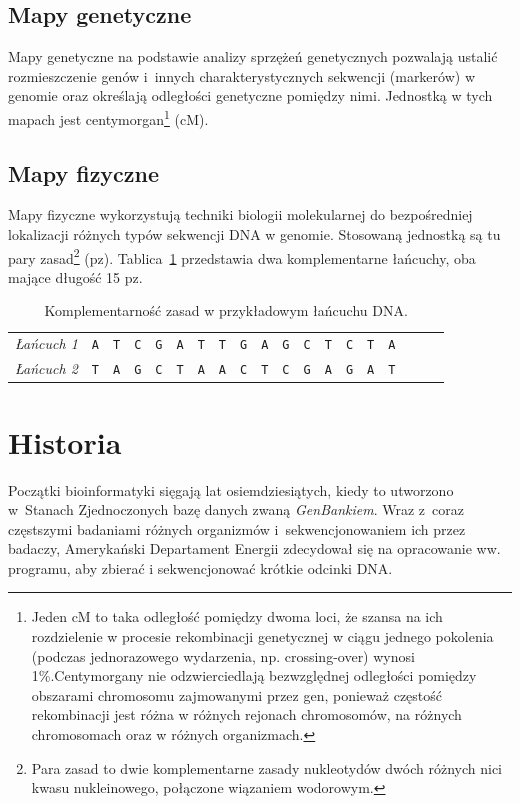 \documentclass[a4paper,12pt,oneside]{mwrep}  %
\begin{document}
\subsection{Mapy genetyczne}
Mapy genetyczne na podstawie analizy sprzężeń genetycznych pozwalają ustalić rozmieszczenie genów i~innych charakterystycznych sekwencji (markerów) w genomie oraz określają odległości genetyczne pomiędzy nimi. Jednostką w tych mapach jest centymorgan\footnote{Jeden cM  to taka odległość pomiędzy dwoma loci, że szansa na ich rozdzielenie w procesie rekombinacji genetycznej w ciągu jednego pokolenia (podczas jednorazowego wydarzenia, np. crossing-over) wynosi 1\%.Centymorgany nie odzwierciedlają bezwzględnej odległości pomiędzy obszarami chromosomu zajmowanymi przez gen, ponieważ częstość rekombinacji jest różna w różnych rejonach chromosomów, na różnych chromosomach oraz w różnych organizmach.} (cM).

\subsection{Mapy fizyczne}
Mapy fizyczne wykorzystują techniki biologii molekularnej do bezpośredniej lokalizacji różnych typów sekwencji DNA w genomie. Stosowaną jednostką są tu pary zasad\footnote{Para zasad to dwie komplementarne zasady nukleotydów dwóch różnych nici kwasu nukleinowego, połączone wiązaniem wodorowym.} (pz). Tablica~\ref{lancuchy_DNA} przedstawia dwa komplementarne łańcuchy, oba mające długość 15 pz.
\begin{table}[!hb]
	\begin{center}
		\begin{tabular}{c|c|c|c|c|c|c|c|c|c|c|c|c|c|c|c|c|c|c|}\cline{2-16}\emph{Łańcuch 1}&
		\verb|A|&\verb|T|&\verb|C|&\verb|G|&\verb|A|&\verb|T|&\verb|T|&\verb|G|&\verb|A|&\verb|G|&\verb|C|&\verb|T|&\verb|C|&\verb|T|&\verb|A|\\ \cline{2-16}
		\emph{Łańcuch 2} &\verb|T|&\verb|A|&\verb|G|&\verb|C|&\verb|T|&\verb|A|&\verb|A|&\verb|C|&\verb|T|&\verb|C|&\verb|G|&\verb|A|&\verb|G|&\verb|A|&\verb|T|\\ \cline{2-16}
		\end{tabular}
	\end{center}
\caption{Komplementarność zasad w przykładowym łańcuchu DNA.}
\label{lancuchy_DNA}
\end{table}

\section{Historia}
Początki bioinformatyki sięgają lat osiemdziesiątych, kiedy to utworzono w~Stanach Zjednoczonych bazę danych zwaną \emph{GenBankiem}. Wraz z~coraz częstszymi badaniami różnych organizmów i~sekwencjonowaniem ich przez badaczy, Amerykański Departament Energii zdecydował się na opracowanie ww. programu, aby zbierać i sekwencjonować krótkie odcinki DNA. 
\end{document}
